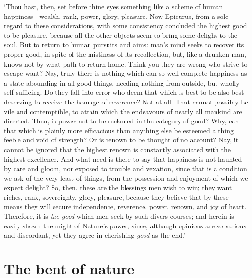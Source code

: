 \documentclass[12pt]{book}
\begin{document}
`Thou hast, then, set before thine eyes something like a scheme of human
happiness---wealth, rank, power, glory, pleasure. Now Epicurus, from a
sole regard to these considerations, with some consistency concluded the
highest good to be pleasure, because all the other objects seem to bring
some delight to the soul. But to return to human pursuits and aims:
man's mind seeks to recover its proper good, in spite of the mistiness
of its recollection, but, like a drunken man, knows not by what path to
return home. Think you they are wrong who strive to escape want? Nay,
truly there is nothing which can so well complete happiness as a state
abounding in all good things, needing nothing from outside, but wholly
self-sufficing. Do they fall into error who deem that which is best to
be also best deserving to receive the homage of reverence? Not at all.
That cannot possibly be vile and contemptible, to attain which the
endeavours of nearly all mankind are directed. Then, is power not to be
reckoned in the category of good? Why, can that which is plainly more
efficacious than anything else be esteemed a thing feeble and void of
strength? Or is renown to be thought of no account? Nay, it cannot be
ignored that the highest renown is constantly associated with the
highest excellence. And what need is there to say that happiness is not
haunted by care and gloom, nor exposed to trouble and vexation, since
that is a condition we ask of the very least of things, from the
possession and enjoyment of which we expect delight? So, then, these are
the blessings men wish to win; they want riches, rank, sovereignty,
glory, pleasure, because they believe that by these means they will
secure independence, reverence, power, renown, and joy of heart.
Therefore, it is \emph{the good} which men seek by such divers courses; and
herein is easily shown the might of Nature's power, since, although
opinions are so various and discordant, yet they agree in cherishing
\emph{good} as the end.'




\section{The bent of nature}
\end{document}
